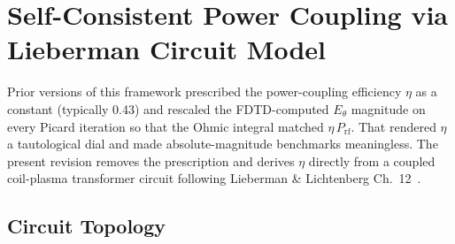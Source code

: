\documentclass[11pt,a4paper]{report}
\begin{document}
\section{Self-Consistent Power Coupling via Lieberman Circuit Model}
\label{sec:selfconsistent-eta}

Prior versions of this framework prescribed the power-coupling efficiency $\eta$ as a constant (typically 0.43) and rescaled the FDTD-computed $E_\theta$ magnitude on every Picard iteration so that the Ohmic integral matched $\eta \, P_\mathrm{rf}$.  That rendered $\eta$ a tautological dial and made absolute-magnitude benchmarks meaningless.  The present revision removes the prescription and derives $\eta$ directly from a coupled coil-plasma transformer circuit following Lieberman \& Lichtenberg Ch.~12~\cite{Lieberman2005}.

\subsection{Circuit Topology}
\end{document}
